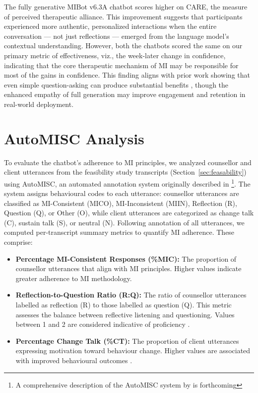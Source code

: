 The fully generative MIBot v6.3A chatbot scores higher on CARE, the measure of perceived therapeutic alliance. This improvement suggests that participants experienced more authentic, personalized interactions when the entire conversation --- not just reflections --- emerged from the language model's contextual understanding. However, both the chatbots scored the same on our primary metric of effectiveness, viz., the week-later change in confidence, indicating that the core therapeutic mechanism of MI may be responsible for most of the gains in confidence. This finding aligns with prior work showing that even simple question-asking can produce substantial benefits \citep{brown2023mi}, though the enhanced empathy of full generation may improve engagement and retention in real-world deployment.

\section{AutoMISC Analysis}
\label{sec:mi-adherence}

To evaluate the chatbot's adherence to MI principles, we analyzed counsellor and client utterances from the feasibility study transcripts (Section~\ref{sec:feasability}) using AutoMISC, an automated annotation system originally described in \citet{mahmood-etal-2025-fully}\footnote{A comprehensive description of the AutoMISC system by \citet{ali2025automated} is forthcoming}.
The system assigns behavioural codes to each utterance: counsellor utterances are classified as MI-Consistent (MICO), MI-Inconsistent (MIIN), Reflection (R), Question (Q), or Other (O), while client utterances are categorized as change talk (C), sustain talk (S), or neutral (N). Following annotation of all utterances, we computed per-transcript summary metrics to quantify MI adherence. These comprise:

\begin{itemize}

    \item \textbf{Percentage MI-Consistent Responses (\%MIC):} The proportion of counsellor utterances that align with MI principles. Higher values indicate greater adherence to MI methodology.
    
    \item \textbf{Reflection-to-Question Ratio (R:Q):} The ratio of counsellor utterances labelled as reflection (R) to those labelled as question (Q). This metric assesses the balance between reflective listening and questioning. Values between 1 and 2 are considered indicative of proficiency \citep{moyers2016}.

    \item \textbf{Percentage Change Talk (\%CT):} The proportion of client utterances expressing motivation toward behaviour change. Higher values are associated with improved behavioural outcomes \citep{apodaca2009}.
\end{itemize}


